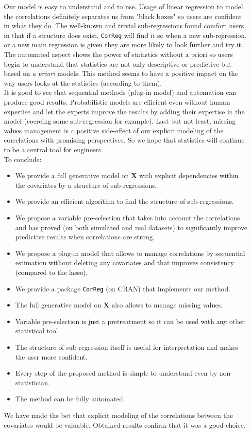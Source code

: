\documentclass[12pt,a4paper]{report}
\begin{document}
		Our model is easy to understand and to use. Usage of linear regression to model the correlations definitely separates us from "black boxes" so users are confident in what they do. The well-known and trivial sub-regressions found comfort users in that if a structure does exist, {\tt CorReg} will find it so when a new sub-regression, or a new main regression is given they are more likely to look further and try it. The automated aspect shows the power of statistics without a priori so users begin to understand that statistics are not only descriptive or predictive but based on {\it a priori} models. This method seems to have a positive impact on the way users looks at the statistics (according to them). \\
		
		It is good to see that sequential methods (plug-in model) and automation can produce good results. Probabilistic models are efficient even without human expertise and let the experts improve the results by adding their expertise in the model (coercing some sub-regression for example). Last but not least, missing values management is a positive side-effect of our explicit modeling of the correlations with promising perspectives.
		 So we hope that statistics will continue to be a central tool for engineers.\\
					
		To conclude:
		\begin{itemize}
			\item We provide a full generative model on $\boldsymbol{X}$ with explicit dependencies within the covariates by a structure of sub-regressions.
			\item We provide an efficient algorithm to find the structure of sub-regressions.
			\item We propose a variable pre-selection that takes into account the correlations and has proved (on both simulated and real datasets) to significantly improve predictive results when correlations are strong.
			\item We propose a plug-in model that allows to manage correlations by sequential estimation without deleting any covariates and that improves consistency (compared to the {\sc lasso}).
			\item We provide a package {\tt CorReg} (on CRAN) that implements our method.
			\item The full generative model on $\boldsymbol{X}$ also allows to manage missing values.
			\item Variable pre-selection is just a pretreatment so it can be used with any other statistical tool.
			\item The structure of sub-regression itself is useful for interpretation and makes the user more confident.
			\item Every step of the proposed method is simple to understand even by non-statistician.
			\item The method can be fully automated.
		\end{itemize}
		We have made the bet that explicit modeling of the correlations between the covariates would be valuable. Obtained results confirm that it was a good choice.		
		
\end{document}
